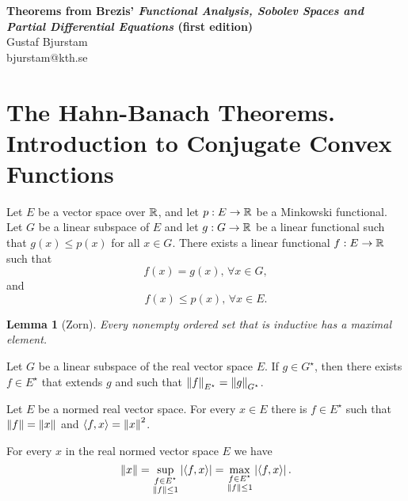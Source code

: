\documentclass[11pt]{article}
\theoremstyle{plain}
\newtheorem{lemma}{Lemma}[section]
\begin{document}
\begin{center}
\textbf{\large Theorems from Brezis' \textit{Functional Analysis, Sobolev Spaces and Partial Differential Equations} (first edition)} \\
Gustaf Bjurstam\\
bjurstam@kth.se\\
\end{center}

\section{The Hahn-Banach Theorems. Introduction to Conjugate Convex Functions}
\begin{theorem}
    Let $E$ be a vector space over $\mathbb{R}$, and let $p:E\to\mathbb{R}$ be a Minkowski functional. Let $G$ be a linear subspace of $E$ and let $g:G\to \mathbb{R}$ be a linear functional such that $g(x)\leq p(x)$ for all $x\in G$. There exists a linear functional $f:E\to \mathbb{R}$ such that
    \begin{equation*}
        f(x)=g(x),\, \forall x\in G,
    \end{equation*}
    and 
    \begin{equation*}
        f(x)\leq p(x),\, \forall x\in E.
    \end{equation*}
\end{theorem}

\begin{lemma}[Zorn]
    Every nonempty ordered set that is inductive has a maximal element.
\end{lemma}

\begin{corollary}
    Let $G$ be a linear subspace of the real vector space $E$. If $g\in G^\star$, then there exists $f\in E^\star$ that extends $g$ and such that $\left\lVert f\right\rVert_{E^\star} = \left\lVert g\right\rVert_{G^\star}$.
\end{corollary}

\begin{corollary}
    Let $E$ be a normed real vector space. For every $x\in E$ there is $f\in E^\star$ such that $\left\lVert f\right\rVert = \left\lVert x\right\rVert$ and $\left\langle f, x\right\rangle = \left\lVert x\right\rVert^2$.
\end{corollary}

\begin{corollary}
    For every $x$ in the real normed vector space $E$ we have
    \begin{equation*}
        \left\lVert x\right\rVert = \sup_{\substack{f\in E^\star \\ \left\lVert f\right\rVert\leq 1}} \left|\left\langle f, x\right\rangle\right| = \max_{\substack{f\in E^\star \\ \left\lVert f\right\rVert\leq 1}} \left|\left\langle f, x\right\rangle\right|.
    \end{equation*}
\end{corollary}
\end{document}

